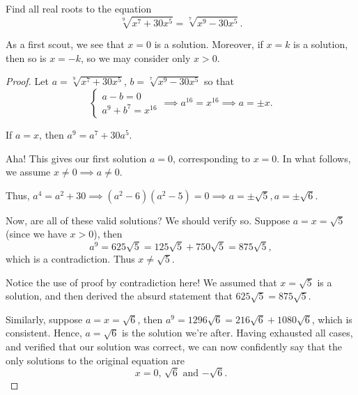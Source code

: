 \documentclass[../jarvis.tex]{subfiles}
\begin{document}
\begin{example}[2021 SMO(O) P10]
Find all real roots to the equation
$$\sqrt[9]{x^7+30x^5}=\sqrt[7]{x^9-30x^5}.$$
\end{example}
As a first scout, we see that $x=0$ is a solution. Moreover, if $x=k$ is a solution, then so is $x=-k$, so we may consider only $x > 0$.
\begin{proof}
Let $a=\sqrt[9]{x^7+30x^5}$, $b=\sqrt[7]{x^9-30x^5}$ so that
$$\begin{cases}
    a-b=0 \\
    a^9+b^7=x^{16}
\end{cases}
\implies
a^{16}=x^{16} \implies a=\pm x.$$

If $a=x$, then $a^9=a^7+30a^5.$ 

Aha! This gives our first solution $a=0$, corresponding to $x=0$. In what follows, we assume $x\neq 0 \implies a\neq 0$.

Thus, $a^4=a^2+30 \implies (a^2-6)(a^2-5)=0 \implies a=\pm \sqrt{5}, a=\pm \sqrt{6}$.

Now, are all of these valid solutions? We should verify so. Suppose $a=x=\sqrt{5}$ (since we have $x>0$), then 
$$a^9=625\sqrt{5}=125\sqrt{5}+750\sqrt{5}=875\sqrt{5},$$ which is a contradiction. Thus $x\neq \sqrt{5}$.
\begin{remark}
Notice the use of proof by contradiction here! We assumed that $x=\sqrt{5}$ is a solution, and then derived the absurd statement that $625\sqrt{5}=875\sqrt{5}$.
\end{remark}
Similarly, suppose $a=x=\sqrt{6}$, then $a^9=1296\sqrt{6}=216\sqrt{6}+1080\sqrt{6}$, which is consistent. Hence, $a=\sqrt{6}$ is the solution we're after. Having exhausted all cases, and verified that our solution was correct, we can now confidently say that the only solutions to the original equation are $$\boxed{\text{$x=0$, $\sqrt{6}$ and $-\sqrt{6}$}}.$$
\end{proof}
\end{document}
